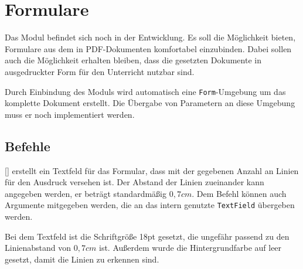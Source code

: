 \section{Formulare}
\label{modul:formulare}
Das Modul  befindet sich noch in der Entwicklung. Es soll die Möglichkeit bieten, Formulare aus dem  in PDF-Dokumenten komfortabel einzubinden. Dabei sollen auch die Möglichkeit erhalten bleiben, dass die gesetzten Dokumente in ausgedruckter Form für den Unterricht nutzbar sind.

Durch Einbindung des Moduls wird automatisch eine \texttt{Form}-Umgebung um das komplette Dokument erstellt. Die Übergabe von Parametern an diese Umgebung muss er noch implementiert werden.

\subsection{Befehle}
\begin{commands}
    []
		erstellt ein Textfeld für das Formular, dass mit der gegebenen Anzahl an Linien für den Ausdruck versehen ist. Der Abstand der Linien zueinander kann angegeben werden, er beträgt standardmäßig $0,7\unit{cm}$. Dem Befehl können auch Argumente mitgegeben werden, die an das intern genutzte \texttt{TextField} übergeben werden.

		Bei dem Textfeld ist die Schriftgröße 18pt gesetzt, die ungefähr passend zu den Linienabstand von $0,7\unit{cm}$ ist. Außerdem wurde die Hintergrundfarbe auf leer gesetzt, damit die Linien zu erkennen sind.
\begin{example}
\end{example}
\end{commands}